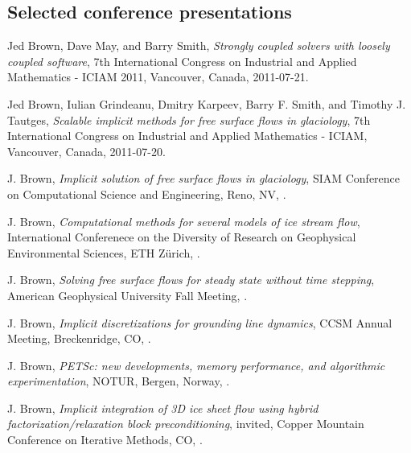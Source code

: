 \documentclass[10pt,letterpaper]{article}
\newcommand\ptitle[1]{\textit{#1}} %
\renewenvironment{itemize}{
  \begin{list}{}{
    \setlength{\leftmargin}{1.5em}
    \setlength{\itemsep}{0.25em}
    \setlength{\parskip}{0pt}
    \setlength{\parsep}{0.25em}
  }
}{
  \end{list}
}
\begin{document}
\subsection*{Selected conference presentations}
\begin{itemize}
\item Jed Brown, Dave May, and Barry Smith, \ptitle{Strongly coupled solvers with loosely coupled software}, 7th International Congress on Industrial and Applied Mathematics - ICIAM 2011, Vancouver, Canada, 2011-07-21.
\item Jed Brown, Iulian Grindeanu, Dmitry Karpeev, Barry F. Smith, and Timothy J. Tautges, \ptitle{Scalable implicit methods for free surface flows in glaciology}, 7th International Congress on Industrial and Applied Mathematics - ICIAM, Vancouver, Canada, 2011-07-20.
\item J. Brown, \ptitle{Implicit solution of free surface flows in glaciology}, SIAM Conference on Computational Science and Engineering, Reno, NV, .
\item J. Brown, \ptitle{Computational methods for several models of ice stream flow}, International Conferenece on the Diversity of Research on Geophysical Environmental Sciences, ETH Z\"urich, .
\item J. Brown, \ptitle{Solving free surface flows for steady state without time stepping}, American Geophysical University Fall Meeting, .
\item J. Brown, \ptitle{Implicit discretizations for grounding line dynamics}, CCSM Annual Meeting, Breckenridge, CO,  .
\item J. Brown, \ptitle{PETSc: new developments, memory performance, and algorithmic experimentation}, NOTUR, Bergen, Norway, .
\item J. Brown, \ptitle{Implicit integration of 3D ice sheet flow using hybrid factorization/relaxation block preconditioning}, invited, Copper Mountain Conference on Iterative Methods, CO, .
\end{itemize}
\end{document}
